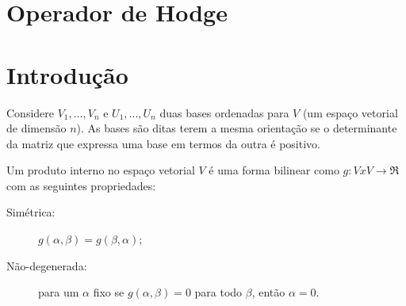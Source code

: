 \section{Operador de Hodge}
\section{Introdução}
Considere ${V_1,...,V_n}$ e ${U_1,...,U_n}$ duas bases ordenadas para $V$ (um espaço vetorial de dimensão $n$). As bases são ditas terem a mesma orientação se o determinante da matriz que expressa uma base em termos da outra é positivo.

Um produto interno no espaço vetorial $V$ é uma forma bilinear como $g:VxV \rightarrow \Re$ com as seguintes propriedades:
\begin{description}
 \item[Simétrica:] $g(\alpha,\beta)=g(\beta,\alpha)$;
 \item[Não-degenerada:] para um $\alpha$ fixo se $g(\alpha,\beta)=0$ para todo $\beta$, então $\alpha=0$.
 \end{description}